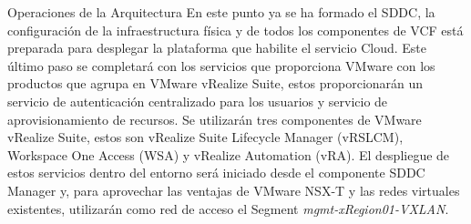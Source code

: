 \begin{subsection}{Operaciones de la Arquitectura}
    En este punto ya se ha formado el SDDC, la configuración de la infraestructura física y de todos los componentes de VCF está preparada para desplegar la plataforma que habilite el servicio Cloud. Este último paso se completará con los servicios que proporciona VMware con los productos que agrupa en VMware vRealize Suite, estos proporcionarán un servicio de autenticación centralizado para los usuarios y servicio de aprovisionamiento de recursos. Se utilizarán tres componentes de VMware vRealize Suite, estos son vRealize Suite Lifecycle Manager (vRSLCM), Workspace One Access (WSA) y vRealize Automation (vRA). El despliegue de estos servicios dentro del entorno será iniciado desde el componente SDDC Manager y, para aprovechar las ventajas de VMware NSX-T y las redes virtuales existentes, utilizarán como red de acceso el Segment \textit{mgmt-xRegion01-VXLAN}.

    

\end{subsection}
